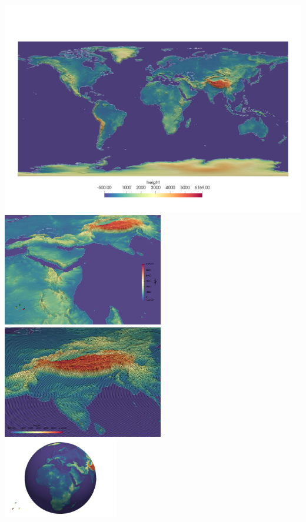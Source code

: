 \begin{center}
\includegraphics[width=14cm]{python_codes/fieldstone_69/topo/topo.png}\\
\includegraphics[width=7cm]{python_codes/fieldstone_69/topo/topo2.png}
\includegraphics[width=7cm]{python_codes/fieldstone_69/topo/topo3.png}\\
\includegraphics[width=5cm]{python_codes/fieldstone_69/topo/topo3D_1.png}

\end{center}
